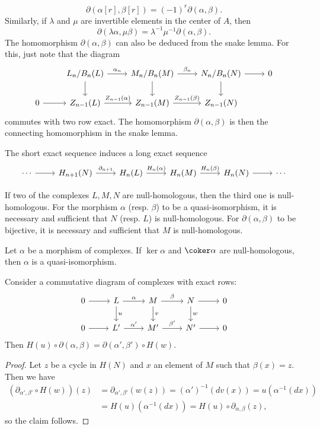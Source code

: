 \[\partial(\alpha[r],\beta[r])=(-1)^r\partial(\alpha,\beta).\]
Similarly, if $\lambda$ and $\mu$ are invertible elements in the center of $A$, then
\[\partial(\lambda\alpha,\mu\beta)=\lambda^{-1}\mu^{-1}\partial(\alpha,\beta).\]
The homomorphism $\partial(\alpha,\beta)$ can also be deduced from the snake lemma. For this, just note that the diagram
\[\begin{tikzcd}
&L_n/B_n(L)\ar[r,"\alpha_n"]\ar[d]&M_n/B_n(M)\ar[r,"\beta_n"]\ar[d]&N_n/B_n(N)\ar[r]\ar[d]&0\\
0\ar[r]&Z_{n-1}(L)\ar[r,"Z_{n-1}(\alpha)"]&Z_{n-1}(M)\ar[r,"Z_{n-1}(\beta)"]&Z_{n-1}(N)&
\end{tikzcd}\]
commutes with two row exact. The homomorphism $\partial(\alpha,\beta)$ is then the connecting homomorphism in the snake lemma.
\begin{theorem}
The short exact sequence induces a long exact sequence
\[\begin{tikzcd}
\cdots\ar[r]&H_{n+1}(N)\ar[r,"{\partial_{n+1}}"]&H_n(L)\ar[r,"H_n(\alpha)"]&H_n(M)\ar[r,"H_n(\beta)"]&H_n(N)\ar[r]&\cdots
\end{tikzcd}\]
\end{theorem}
\begin{corollary}
If two of the complexes $L,M,N$ are null-homologous, then the third one is null-homologous. For the morphism $\alpha$ (resp. $\beta$) to be a quasi-isomorphism, it is necessary and sufficient that $N$ (resp. $L$) is null-homologous. For $\partial(\alpha,\beta)$ to be bijective, it is necessary and sufficient that $M$ is null-homologous.
\end{corollary}
\begin{corollary}
Let $\alpha$ be a morphism of complexes. If $\ker\alpha$ and $\coker\alpha$ are null-homologous, then $\alpha$ is a quasi-isomorphism.
\end{corollary}
\begin{proposition}
Consider a commutative diagram of complexes with exact rows:
\[\begin{tikzcd}
0\ar[r]&L\ar[r,"\alpha"]\ar[d,"u"]&M\ar[r,"\beta"]\ar[d,"v"]&N\ar[r]\ar[d,"w"]&0\\
0\ar[r]&L'\ar[r,"\alpha'"]&M'\ar[r,"\beta'"]&N'\ar[r]&0
\end{tikzcd}\]
Then $H(u)\circ\partial(\alpha,\beta)=\partial(\alpha',\beta')\circ H(w)$.
\end{proposition}
\begin{proof}
Let $z$ be a cycle in $H(N)$ and $x$ an element of $M$ such that $\beta(x)=z$. Then we have
\begin{align*}
(\partial_{\alpha',\beta'}\circ H(w))(z)&=\partial_{\alpha',\beta'}(w(z))=(\alpha')^{-1}(dv(x))=u(\alpha^{-1}(dx))\\
&=H(u)(\alpha^{-1}(dx))=H(u)\circ\partial_{\alpha,\beta}(z),
\end{align*}
so the claim follows.
\end{proof}

